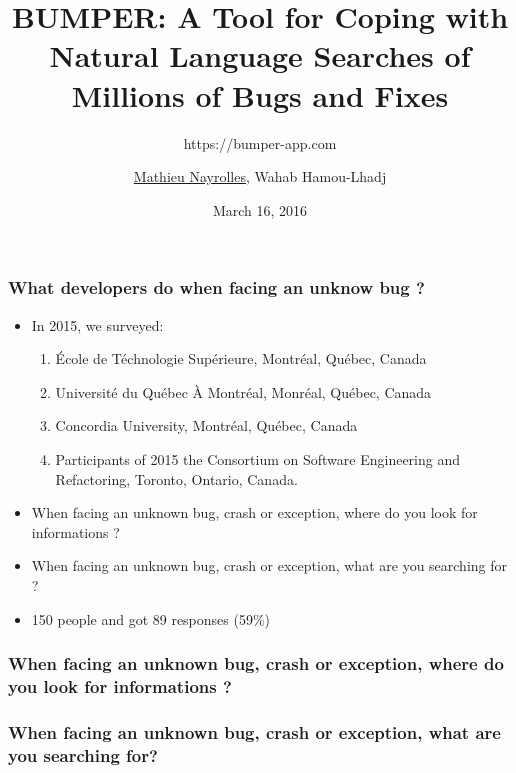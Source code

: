 \documentclass{beamer}
\title[BUMPER]{BUMPER: A Tool for Coping with Natural Language Searches of Millions of Bugs and Fixes} %
\subtitle{https://bumper-app.com}
\author[Mathieu Nayrolles]{\underline{Mathieu Nayrolles}, Wahab Hamou-Lhadj} %
\institute[Concordia] %
{
Software Behaviour Analysis (SBA) Research Lab, ECE,  Concordia, Montr\'eal, Canada
\medskip
\textit{mathieu.nayrolles@gmail.com, wahab.hamou-lhadj@concordia.ca} %
}
\date{March 16, 2016} %
\begin{document}
\begin{frame}
\titlepage %
\end{frame}


\begin{frame}
\frametitle{What developers do when facing an unknow bug ?}

\begin{itemize}
  \item In 2015, we surveyed:
  \begin{enumerate}
    \item \'Ecole de T\'echnologie Sup\'erieure, Montr\'eal, Qu\'ebec, Canada
    \item Universit\'e du Qu\'ebec \`A Montr\'eal, Monr\'eal, Qu\'ebec, Canada
    \item Concordia University, Montr\'eal, Qu\'ebec, Canada
    \item Participants of 2015 the Consortium on Software Engineering and Refactoring, Toronto, Ontario, Canada.
  \end{enumerate}


  \item When facing an unknown bug, crash or exception, where do you look for informations ?
  \item When facing an unknown bug, crash or exception, what are you searching for ?

\item 150 people and got 89 responses (59\%)
\end{itemize}

\end{frame}

\begin{frame}
\frametitle{When facing an unknown bug, crash or exception, where do you look
for informations ?}





\end{frame}

\begin{frame}
\frametitle{When facing an unknown bug, crash or exception, what are you
searching for?}



\end{frame}
\end{document}
